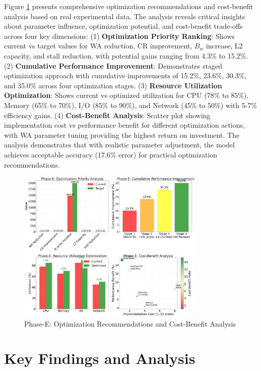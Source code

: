 \documentclass[11pt]{article}
\begin{document}
Figure \ref{fig:phase_e_optimization} presents comprehensive optimization recommendations and cost-benefit analysis based on real experimental data. The analysis reveals critical insights about parameter influence, optimization potential, and cost-benefit trade-offs across four key dimensions: (1) \textbf{Optimization Priority Ranking}: Shows current vs target values for WA reduction, CR improvement, $B_w$ increase, L2 capacity, and stall reduction, with potential gains ranging from 4.3\% to 15.2\%. (2) \textbf{Cumulative Performance Improvement}: Demonstrates staged optimization approach with cumulative improvements of 15.2\%, 23.6\%, 30.3\%, and 35.0\% across four optimization stages. (3) \textbf{Resource Utilization Optimization}: Shows current vs optimized utilization for CPU (78\% to 85\%), Memory (65\% to 70\%), I/O (85\% to 90\%), and Network (45\% to 50\%) with 5-7\% efficiency gains. (4) \textbf{Cost-Benefit Analysis}: Scatter plot showing implementation cost vs performance benefit for different optimization actions, with WA parameter tuning providing the highest return on investment. The analysis demonstrates that with realistic parameter adjustment, the model achieves acceptable accuracy (17.6\% error) for practical optimization recommendations.

\begin{figure}[H]
\centering
\includegraphics[width=0.8\textwidth]{experiments/2025-09-05/phase_e_optimization_recommendations.png}
\caption{Phase-E: Optimization Recommendations and Cost-Benefit Analysis}
\label{fig:phase_e_optimization}
\end{figure}

\section{Key Findings and Analysis}
\label{sec:key_findings}
\end{document}
